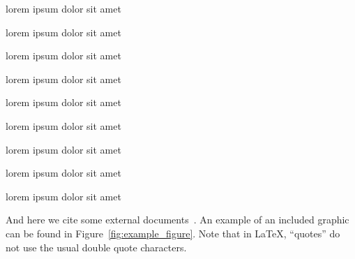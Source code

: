 \begin{lemma} lorem ipsum dolor sit amet \end{lemma}

\begin{corollary} lorem ipsum dolor sit amet \end{corollary}

\begin{observation} lorem ipsum dolor sit amet \end{observation}

\begin{definition} lorem ipsum dolor sit amet \end{definition}

\begin{problem} lorem ipsum dolor sit amet \end{problem}

\begin{assumption} lorem ipsum dolor sit amet \end{assumption}

\begin{example} lorem ipsum dolor sit amet \end{example}

\begin{claim} lorem ipsum dolor sit amet \end{claim}

\begin{remark} lorem ipsum dolor sit amet \end{remark}

And here we cite some external documents~\cite{TestReference,
TestReference2}. An example of an included graphic can be found in
Figure~\ref{fig:example_figure}. Note that in \LaTeX, ``quotes'' do not use
the usual double quote characters.